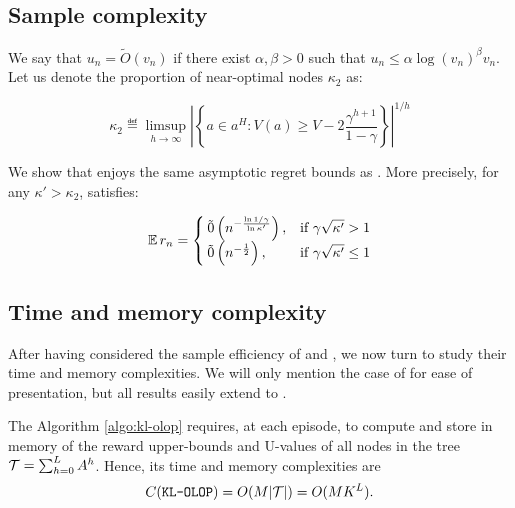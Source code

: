 \subsection{Sample complexity}
\label{sec:sample-complexity}

We say that $u_n = \tilde{O}(v_n)$ if there exist $\alpha, \beta >0$ such that $u_n \leq \alpha \log(v_n)^\beta v_n$.
Let us denote the proportion of near-optimal nodes $\kappa_2$ as:


\begin{equation*}
\label{eq:kappa}
\kappa_2 \eqdef \limsup_{h\rightarrow\infty}{\left|\left\{a\in a^H:V(a) \geq V - 2\frac{\gamma^{h+1}}{1-\gamma}\right\}\right|^{1/h}}
\end{equation*}

\begin{theorem}
	\label{thm:regret}
	\begin{leftbar}[theorembar]
	We show that \KLOLOP enjoys the same asymptotic regret bounds as \OLOP. More precisely, for any $\kappa' > \kappa_2$, \KLOLOP satisfies:
	
	
	\begin{equation*}
	\expectedvalue r_n = \begin{cases}
	\tilde{0}\left(n^{-\frac{\log 1/\gamma}{\log \kappa'}}\right), & \text{if}\ \gamma\sqrt{\kappa'} > 1 \\
	\tilde{0}\left(n^{-\frac{1}{2}}\right), & \text{if}\ \gamma\sqrt{\kappa'} \leq 1
	\end{cases}
	\end{equation*}
	\end{leftbar}
\end{theorem}

\subsection{Time and memory complexity}
\label{sec:time-complexity}

After having considered the sample efficiency of \OLOP and \KLOLOP, we now turn to study their time and memory complexities. We will only mention the case of \KLOLOP for ease of presentation, but all results easily extend to \OLOP.

The Algorithm \ref{algo:kl-olop} requires, at each episode, to compute and store in memory of the reward upper-bounds and U-values of all nodes in the tree $\mathcal{T} = \sum_{h=0}^L A^h$.
Hence, its time and memory complexities are 
\begin{equation}
C(\texttt{KL-OLOP}) = O(M|\mathcal{T}|) = O(MK^L).
\end{equation}

